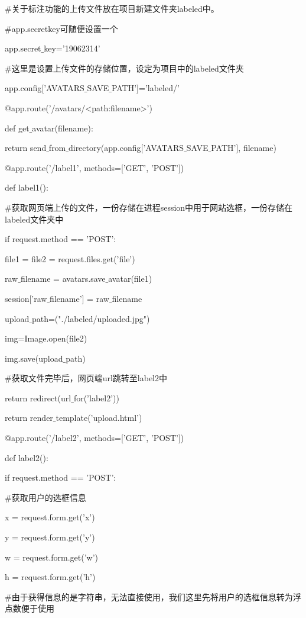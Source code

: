 \documentclass[bachelor_p]{hdu-thesis}
\begin{document}
$\#$关于标注功能的上传文件放在项目新建文件夹labeled中。

$\#$app.secretkey可随便设置一个

app.secret$\_$key='19062314'

$\#$这里是设置上传文件的存储位置，设定为项目中的labeled文件夹

app.config['AVATARS$\_$SAVE$\_$PATH']='labeled/'

@app.route('/avatars/<path:filename>')

def get$\_$avatar(filename):

\qquad return send$\_$from$\_$directory(app.config['AVATARS$\_$SAVE$\_$PATH'], filename)

@app.route('/label1', methods=['GET', 'POST'])

def label1():

$\#$获取网页端上传的文件，一份存储在进程session中用于网站选框，一份存储在labeled文件夹中

\qquad if request.method == 'POST':

\qquad \qquad file1 = file2 = request.files.get('file')

\qquad \qquad raw$\_$filename = avatars.save$\_$avatar(file1)

\qquad \qquad session['raw$\_$filename'] = raw$\_$filename
   
\qquad \qquad upload$\_$path=("./labeled/uploaded.jpg")

\qquad \qquad img=Image.open(file2)

\qquad \qquad img.save(upload$\_$path)

$\#$获取文件完毕后，网页端url跳转至label2中

\qquad \qquad return redirect(url$\_$for('label2'))

\qquad return render$\_$template('upload.html')
    
@app.route('/label2', methods=['GET', 'POST'])

def label2():

\qquad if request.method == 'POST':

$\#$获取用户的选框信息

\qquad \qquad x = request.form.get('x')

\qquad \qquad y = request.form.get('y')

\qquad \qquad w = request.form.get('w')

\qquad \qquad h = request.form.get('h')
            
$\#$由于获得信息的是字符串，无法直接使用，我们这里先将用户的选框信息转为浮点数便于使用
\end{document}
